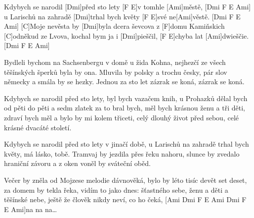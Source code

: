 
\sloka
[Ami]Kdybych se narodil [Dmi]před sto lety [F E]v tomhle [Ami]městě, [Dmi F E Ami]
u Larischů na zahradě [Dmi]trhal bych květy [F E]své ne[Ami]věstě. [Dmi F E Ami]
[C]Moje nevěsta by [Dmi]byla dcera ševcova
z [F]domu Kamiňskich [C]odněkud ze Lvova,
kochal bym ja i [Dmi]pieščil, [F E]chyba lat [Ami]dwieščie. [Dmi F E Ami]

\sloka
Bydleli bychom na Sachsenbergu v domě u žida Kohna,
nejhezčí ze všech těšínských šperků byla by ona.
Mluvila by polsky a trochu česky,
pár slov německy a smála by se hezky.
Jednou za sto let zázrak se koná, zázrak se koná.

\sloka
Kdybych se narodil před sto lety, byl bych vazačem knih,
u Prohazků dělal bych od pěti do pěti a sedm zlatek za to bral bych,
měl bych krásnou ženu a tři děti,
zdraví bych měl a bylo by mi kolem třiceti,
celý dlouhý život před sebou, celé krásné dvacáté století.

\sloka
Kdybych se narodil před sto lety v jinačí době,
u Larischů na zahradě trhal bych květy, má lásko, tobě.
Tramvaj by jezdila přes řeku nahoru,
slunce by zvedalo hraniční závoru
a z oken voněl by sváteční oběd.

\sloka
Večer by zněla od Mojzese melodie dávnověká,
bylo by léto tisíc devět set deset, za domem by tekla řeka,
vidím to jako dnes: šťastného sebe,
ženu a děti a těšínské nebe,
ještě že člověk nikdy neví, co ho čeká,
[Ami Dmi F E Ami Dmi F E Ami]na na na…
